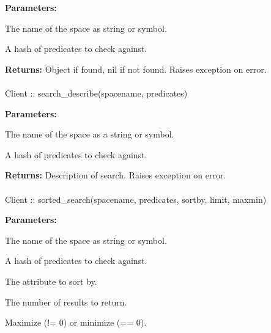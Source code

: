 \noindent\textbf{Parameters:}
\begin{description}[labelindent=\widthof{{\code{predicates}}},leftmargin=*,noitemsep,nolistsep,align=right]
\item[\code{spacename}] The name of the space as string or symbol.
\item[\code{predicates}] A hash of predicates to check against.
\end{description}

\noindent\textbf{Returns:}
Object if found, nil if not found.  Raises exception on error.

\paragraph{}
\label{api:ruby:search_describe}
\begin{ccode}
Client :: search_describe(spacename, predicates)
\end{ccode}
\funcdesc 

\noindent\textbf{Parameters:}
\begin{description}[labelindent=\widthof{{\code{predicates}}},leftmargin=*,noitemsep,nolistsep,align=right]
\item[\code{spacename}] The name of the space as a string or symbol.
\item[\code{predicates}] A hash of predicates to check against.
\end{description}

\noindent\textbf{Returns:}
Description of search.  Raises exception on error.

\paragraph{}
\label{api:ruby:sorted_search}
\begin{ccode}
Client :: sorted_search(spacename, predicates, sortby, limit, maxmin)
\end{ccode}
\funcdesc 

\noindent\textbf{Parameters:}
\begin{description}[labelindent=\widthof{{\code{predicates}}},leftmargin=*,noitemsep,nolistsep,align=right]
\item[\code{spacename}] The name of the space as string or symbol.
\item[\code{predicates}] A hash of predicates to check against.
\item[\code{sortby}] The attribute to sort by.
\item[\code{limit}] The number of results to return.
\item[\code{maxmin}] Maximize (!= 0) or minimize (== 0).
\end{description}


